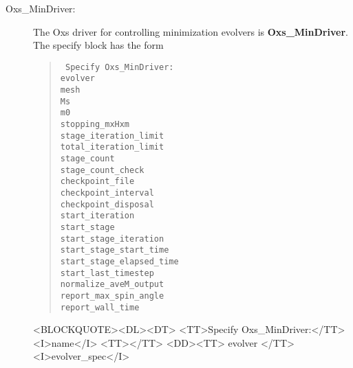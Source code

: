 \begin{description}
%
\item[Oxs\_MinDriver:\label{html:MinDriver}]
The Oxs driver for controlling minimization evolvers is
\textbf{Oxs\_MinDriver}.  The specify block has the form
\begin{latexonly}
\begin{quote}\tt
Specify Oxs\_MinDriver: \ocb\\
 \bi evolver \\
 \bi mesh \\
 \bi Ms \\
 \bi m0 \\
 \bi stopping\_mxHxm \\
 \bi stage\_iteration\_limit \\
 \bi total\_iteration\_limit \\
 \bi stage\_count \\
 \bi stage\_count\_check \\
 \bi checkpoint\_file \\
 \bi checkpoint\_interval \\
 \bi checkpoint\_disposal \\
 \bi start\_iteration \\
 \bi start\_stage \\
 \bi start\_stage\_iteration \\
 \bi start\_stage\_start\_time \\
 \bi start\_stage\_elapsed\_time \\
 \bi start\_last\_timestep \\
 \bi normalize\_aveM\_output \\
 \bi report\_max\_spin\_angle \\
 \bi report\_wall\_time \\
\ccb
\end{quote}
\end{latexonly}
\begin{rawhtml}
<BLOCKQUOTE><DL><DT>
<TT>Specify Oxs_MinDriver:</TT><I>name</I> <TT>{</TT>
<DD><TT> evolver </TT><I>evolver_spec</I>
}
\end{rawhtml}
\end{description}
